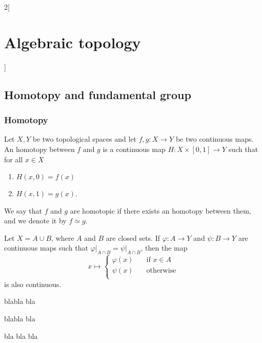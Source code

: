 \documentclass[../../../main.tex]{subfiles}
\begin{document}
\renewcommand{\col}{\geo}
\begin{multicols}{2}[\section{Algebraic topology}]
  \subsection{Homotopy and fundamental group}
  \subsubsection{Homotopy}
  \begin{definition}
  	Let $X,Y$ be two topological spaces and let $f,g: X \to Y$ be two continuous maps. An homotopy between $f$ and $g$ is a continuous map $H:X\times [0,1] \to Y$ such that for all $x\in X$
  	\begin{enumerate}
  		\item $H(x,0)=f(x)$
  		\item $H(x,1)=g(x)$.
  	\end{enumerate}
  We say that $f$ and $g$ are homotopic if there exists an homotopy between them, and we denote it by $f\simeq g$.
  \end{definition}
  
  \begin{lemma}
    Let $X=A\cup B$, where $A$ and $B$ are closed sets. If $\varphi: A \to Y$ and $\psi: B \to Y$ are continuous maps such that $\left.\varphi \right|_{A\cap B}=\left.\psi \right|_{A\cap B}$, then the map $$x\mapsto \begin{cases}
    	\varphi(x) & \quad\text{if  } x\in A \\
    	\psi(x)  & \quad\text{otherwise}\\
    \end{cases}$$ is also continuous.
  \end{lemma}

	\begin{theorem}
		blabla bla
	\end{theorem}
  \begin{proposition}
    blabla bla
  \end{proposition}
  \begin{corollary}
    bla bla bla
  \end{corollary}
\end{multicols}
\end{document}
